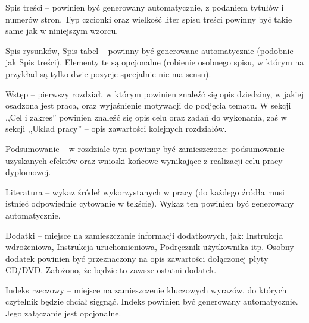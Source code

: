 Spis treści -- powinien być generowany automatycznie, z podaniem tytułów i numerów stron. Typ czcionki oraz wielkość liter spisu treści powinny być takie same jak w niniejszym wzorcu.

Spis rysunków, Spis tabel -- powinny być generowane automatycznie (podobnie jak Spis treści). Elementy te są opcjonalne (robienie osobnego spisu, w którym na przykład są tylko dwie pozycje specjalnie nie ma sensu).

Wstęp -- pierwszy rozdział, w którym powinien znaleźć się opis dziedziny, w jakiej osadzona jest praca, oraz wyjaśnienie motywacji do podjęcia tematu.  
W sekcji ,,Cel i zakres'' powinien znaleźć się opis celu oraz zadań do wykonania, zaś w sekcji ,,Układ pracy'' -- opis zawartości kolejnych rozdziałów.

Podsumowanie -- w rozdziale tym powinny być zamieszczone: podsumowanie uzyskanych efektów oraz wnioski końcowe wynikające z realizacji celu pracy dyplomowej.

Literatura -- wykaz źródeł wykorzystanych w pracy (do każdego źródła musi istnieć odpowiednie cytowanie w tekście). Wykaz ten powinien być generowany automatycznie.

Dodatki -- miejsce na zamieszczanie informacji dodatkowych, jak: Instrukcja wdrożeniowa, Instrukcja uruchomieniowa, Podręcznik użytkownika itp.
Osobny dodatek powinien być przeznaczony na opis zawartości dołączonej płyty CD/DVD. Założono, że będzie to zawsze ostatni dodatek.

Indeks rzeczowy -- miejsce na zamieszczenie kluczowych wyrazów, do których czytelnik będzie chciał sięgnąć. Indeks powinien być generowany automatycznie. Jego załączanie jest opcjonalne.
